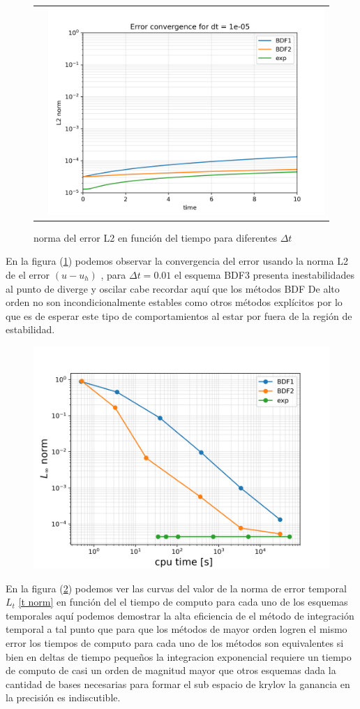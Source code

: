 \documentclass[11pt, spanish]{article}
\begin{document}
\begin{figure}[H]
\begin{tabular}{cc}
&   \includegraphics[width=0.5\linewidth]{res/homogeneo/L2norm_dt_1e-05}
     \end{tabular}
 
\caption{norma del error L2 en funci\'on del tiempo para  diferentes $\Delta t$}
\label{fig:conveg hom}
\end{figure}

En la figura (\ref{fig:conveg hom}) podemos observar la convergencia del error usando la norma L2  de el error $(u-u_h)$ , para $\Delta t = 0.01$ el esquema BDF3 presenta inestabilidades al punto de  diverge y oscilar cabe recordar aqu\'i que los m\'etodos  BDF De alto orden no son incondicionalmente estables \cite{Süli_Mayers_2003} como otros m\'etodos  expl\'icitos por lo que es de esperar este tipo de comportamientos al estar por fuera de la regi\'on de estabilidad. 


\begin{figure}[H]
	\centering
	\includegraphics[width=0.7\linewidth]{res/homogeneo/cpu-L2.pdf}
	\caption{}
	\label{fig:tiempodecalculo H}
\end{figure}
En la figura (\ref{fig:tiempodecalculo H}) podemos ver las curvas del valor de la norma de error temporal $L_t$ \ref{t norm} en funci\'on del el tiempo de computo para cada uno de los esquemas temporales aqu\'i podemos demostrar la alta eficiencia de el m\'etodo de integraci\'on temporal a tal punto que para que los m\'etodos de mayor orden logren el mismo error los tiempos de computo para cada uno de los m\'etodos son equivalentes  si bien en deltas de tiempo pequeños la integracion exponencial requiere un tiempo de computo de casi un orden de magnitud mayor que otros esquemas dada la cantidad de bases necesarias para formar el sub espacio de krylov la ganancia en la precisi\'on  es indiscutible. 
 
\end{document}
